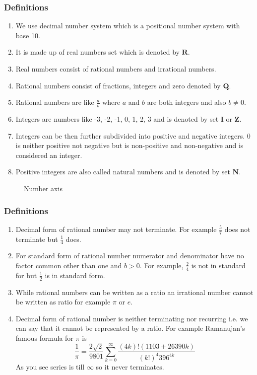 \documentclass[aspectratio=1610]{beamer}
\begin{document}
\begin{frame}
\frametitle{Definitions}
\begin{enumerate}
 \item We use decimal number system which is a positional number system with 
base 10.
 \item It is made up of real numbers set which is denoted by $\mathbf{R}$.
 \item Real numbers consist of rational numbers and irrational numbers.
 \item Rational numbers consist of fractions, integers and zero denoted by 
$\mathbf{Q}$.
 \item Rational numbers are like $\frac{a}{b}$ where $a$ and $b$ are both 
integers and also $b\ne 0$.
 \item Integers are numbers like -3, -2, -1, 0, 1, 2, 3 and is denoted by set 
$\mathbf{I} \text{ or } \mathbf{Z}$.
\item Integers can be then further subdivided into positive and negative 
integers. 0 is neither positive not negative but is non-positive and 
non-negative and is considered an integer.
\item Positive integers are also called natural numbers and is denoted by set 
$\mathbf{N}$.
\end{enumerate}
\begin{figure}
\begin{center}
\caption{Number axis}
\end{center}
\end{figure}
\end{frame}

\begin{frame}
\frametitle{Definitions}
\begin{enumerate}
 \item Decimal form of rational number may not terminate. For example 
$\frac{5}{7}$ does not terminate but $\frac{1}{4}$ does.
 \item For standard form of rational number numerator and denominator have no 
factor common other than one and $b>0$. For example, $\frac{2}{4}$ is not in 
standard for but $\frac{1}{2}$ is in standard form.
\item While rational numbers can be written as a ratio an irrational number 
cannot be written as ratio for example $\pi \text{ or } e$.
\item Decimal form of rational number is neither terminating nor recurring i.e. 
we can say that it cannot be represented by a ratio. For example Ramanujan's 
famous formula for $\pi$ is
\begin{equation}
\frac{1}{\pi} = \frac{2\sqrt{2}}{9801} \sum^\infty_{k=0} 
\frac{(4k)!(1103+26390k)}{(k!)^4 396^{4k}} 
\end{equation}
As you see series is till $\infty$ so it never terminates.
\end{enumerate}
\end{frame}
\end{document}
